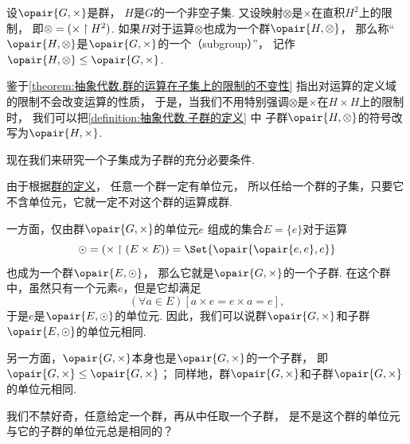 \begin{definition}\label{definition:抽象代数.子群的定义}
设\(\opair{G,\times}\)是群，
\(H\)是\(G\)的一个非空子集.
又设映射\(\otimes\)是\(\times\)在直积\(H^2\)上的限制，
即\(\otimes = (\times \upharpoonright H^2)\).
如果\(H\)对于运算\(\otimes\)也成为一个群\(\opair{H,\otimes}\)，
那么称“\(\opair{H,\otimes}\)是\(\opair{G,\times}\)的一个（subgroup）”，
记作\(\opair{H,\otimes} \AlgebraSubstructure \opair{G,\times}\).
\end{definition}

鉴于\cref{theorem:抽象代数.群的运算在子集上的限制的不变性}
指出对运算的定义域的限制不会改变运算的性质，
于是，当我们不用特别强调\(\otimes\)是\(\times\)在\(H\times H\)上的限制时，
我们可以把\cref{definition:抽象代数.子群的定义} 中
子群\(\opair{H,\otimes}\)的符号改写为\(\opair{H,\times}\).

现在我们来研究一个子集成为子群的充分必要条件.

由于根据\hyperref[definition:抽象代数.群的定义]{群的定义}，
任意一个群一定有单位元，
所以任给一个群的子集，只要它不含单位元，它就一定不对这个群的运算成群.

一方面，仅由群\(\opair{G,\times}\)的单位元\(e\)%
组成的集合\(E=\{e\}\)对于运算\begin{equation*}
	\odot=(\times\SetRestrict(E\times E))
	= \Set{\opair{\opair{e,e},e}}
\end{equation*}
也成为一个群\(\opair{E,\odot}\)，
那么它就是\(\opair{G,\times}\)的一个子群.
在这个群中，虽然只有一个元素\(e\)，但是它却满足\begin{equation*}
	(\forall a \in E)[a \times e = e \times a = e],
\end{equation*}
于是\(e\)是\(\opair{E,\odot}\)的单位元.
因此，我们可以说群\(\opair{G,\times}\)和子群\(\opair{E,\odot}\)的单位元相同.

另一方面，\(\opair{G,\times}\)本身也是\(\opair{G,\times}\)的一个子群，
即\(\opair{G,\times}\AlgebraSubstructure\opair{G,\times}\)；
同样地，群\(\opair{G,\times}\)和子群\(\opair{G,\times}\)的单位元相同.

我们不禁好奇，任意给定一个群，再从中任取一个子群，
是不是这个群的单位元与它的子群的单位元总是相同的？

